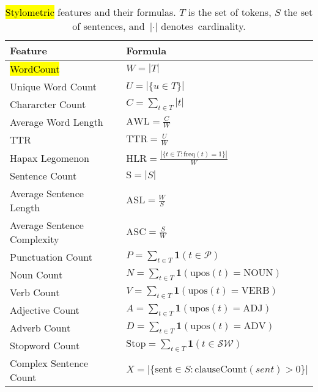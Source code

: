 \documentclass[electronics,article,accept,pdftex,moreauthors,electronics]{Definitions/mdpi}
\begin{document}
\begin{table}[H]
\renewcommand{\arraystretch}{1.3}
\tablesize{\small}
\caption{\hl{Stylometric} %
 features and their formulas. $T$ is the set of tokens, $S$ the set of sentences, and~$|\cdot|$ denotes~cardinality.}
\label{tab:stylo_features}
\begin{tabularx}{\linewidth}{l l}
\toprule
\textbf{Feature} & \textbf{Formula} \\
\midrule
\hl{WordCount}%
 & $W = |T|$ \\
Unique Word Count & $U = |\{u \in T\}|$ \\
Chararcter Count & $C = \sum_{t \in T} |t|$ \\
Average Word Length & $\mathrm{AWL} = \frac{C}{W}$ \\
TTR & $\mathrm{TTR} = \frac{U}{W}$ \\
Hapax Legomenon & $\mathrm{HLR} = \frac{|\{t \in T : \mathrm{freq}(t) = 1\}|}{W}$ \\
Sentence Count & $\mathrm{S} = |S|$ \\
Average Sentence Length & $\mathrm{ASL} = \frac{W}{S}$ \\
Average Sentence Complexity & $\mathrm{ASC} = \frac{S}{W}$ \\
Punctuation Count & $P = \sum_{t \in T} \mathbf{1}(t \in \mathcal{P})$ \\
Noun Count & $\displaystyle N = \sum_{t \in T} \mathbf{1}(\mathrm{upos}(t) = \text{NOUN})$ \\
Verb Count & $\displaystyle V = \sum_{t \in T} \mathbf{1}(\mathrm{upos}(t) = \text{VERB})$ \\
Adjective Count & $\displaystyle A = \sum_{t \in T} \mathbf{1}(\mathrm{upos}(t) = \text{ADJ})$ \\
Adverb Count & $\displaystyle D = \sum_{t \in T} \mathbf{1}(\mathrm{upos}(t) = \text{ADV})$ \\
Stopword Count & $\mathrm{Stop} = \sum_{t \in T} \mathbf{1}(t \in \mathcal{SW})$ \\
Complex Sentence Count & $X = |\{\text{sent} \in S : \mathrm{clauseCount}(sent)>0\}|$ \\

\end{tabularx}
\end{table}
\end{document}
